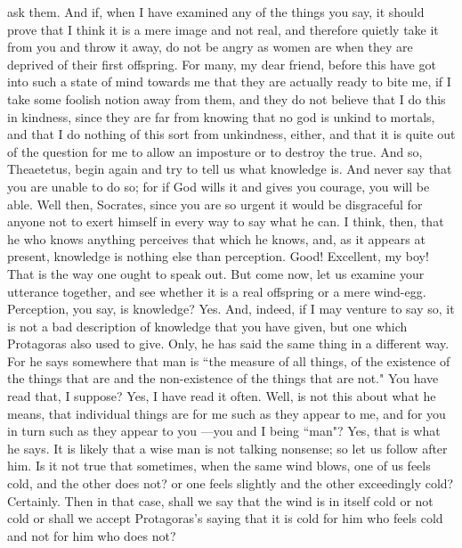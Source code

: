 \documentclass[letterpaper,12pt]{article}
\newcommand{\stephpag}[1]{\marginnote{\small\itshape\fontfamily{ppl}\selectfont #1}}
\begin{document}
\begin{drama}
ask them. And if, when I have examined any of the things you say, it should prove that I think it is a mere image and not real, and therefore quietly take it from you and throw it away, do not be angry as women are when they are deprived of their first offspring. For many, my dear friend, before this have got into such a state of mind towards me that they are actually ready to bite me, if I take some foolish notion away from them, and they do not believe that I do this in kindness, \stephpag{d} since they are far from knowing that no god is unkind to mortals, and that I do nothing of this sort from unkindness, either, and that it is quite out of the question for me to allow an imposture or to destroy the true. And so, Theaetetus, begin again and try to tell us what knowledge is. And never say that you are unable to do so; for if God wills it and gives you courage, you will be able.
\theaetetusspeaks
Well then, Socrates, since you are so urgent it would be disgraceful for anyone not to exert himself in every way \stephpag{e} to say what he can. I think, then, that he who knows anything perceives that which he knows, and, as it appears at present, knowledge is nothing else than perception.
\socratesspeaks
Good! Excellent, my boy! That is the way one ought to speak out. But come now, let us examine your utterance together, and see whether it is a real offspring or a mere wind-egg. Perception, you say, is knowledge?
\theaetetusspeaks
Yes.
\socratesspeaks
And, indeed, if I may venture to say so, it is not a bad description of knowledge \stephpag{152 a} that you have given, but one which Protagoras also used to give. Only, he has said the same thing in a different way. For he says somewhere that man is ``the measure of all things, of the existence of the things that are and the non-existence of the things that are not." You have read that, I suppose?
\theaetetusspeaks
Yes, I have read it often.
\socratesspeaks
Well, is not this about what he means, that individual things are for me such as they appear to me, and for you in turn such as they appear to you —you and I being ``man"?
\theaetetusspeaks
Yes, that is what he says. \stephpag{b}
\socratesspeaks
It is likely that a wise man is not talking nonsense; so let us follow after him. Is it not true that sometimes, when the same wind blows, one of us feels cold, and the other does not? or one feels slightly and the other exceedingly cold?
\theaetetusspeaks
Certainly.
\socratesspeaks
Then in that case, shall we say that the wind is in itself cold or not cold or shall we accept Protagoras's saying that it is cold for him who feels cold and not for him who does not?

\end{drama}
\end{document}
